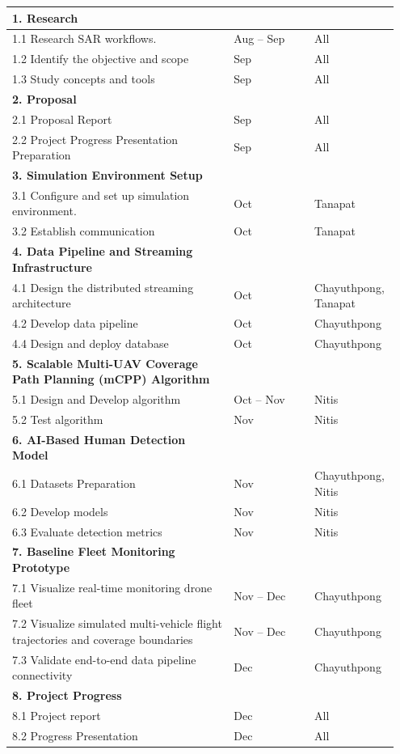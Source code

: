 \documentclass[12pt]{article}
\newcommand{\tablefont}{\fontsize{14pt}{16.8pt}\selectfont}
\begin{document}
{\tablefont
\begin{longtable}{|p{0.55\linewidth}|p{0.2\linewidth}|p{0.2\linewidth}|}
\hline
\rowcolor{orange!40}\textbf{1. Research} & & \\
\hline
1.1 Research SAR workflows. & Aug -- Sep & All \\
\hline
1.2 Identify the objective and scope & Sep & All \\
\hline
1.3 Study concepts and tools & Sep & All \\
\hline
\rowcolor{orange!40}\textbf{2. Proposal} & & \\
\hline
2.1 Proposal Report & Sep & All \\
\hline
2.2 Project Progress Presentation Preparation & Sep & All \\
\hline
\rowcolor{orange!40}\textbf{3. Simulation Environment Setup} & & \\
\hline
3.1 Configure and set up simulation environment. & Oct & Tanapat \\
\hline
3.2 Establish communication & Oct & Tanapat \\
\hline
\rowcolor{orange!40}\textbf{4. Data Pipeline and Streaming Infrastructure} & & \\
\hline
4.1 Design the distributed streaming architecture & Oct & Chayuthpong, Tanapat \\
\hline
4.2 Develop data pipeline & Oct & Chayuthpong \\
\hline
4.4 Design and deploy database & Oct & Chayuthpong \\
\hline
\rowcolor{orange!40}\textbf{5. Scalable Multi-UAV Coverage Path Planning (mCPP) Algorithm} & & \\
\hline
5.1 Design and Develop algorithm & Oct -- Nov & Nitis \\
\hline
5.2 Test algorithm & Nov & Nitis \\
\hline
\rowcolor{orange!40}\textbf{6. AI-Based Human Detection Model} & & \\
\hline
6.1 Datasets Preparation & Nov & Chayuthpong, Nitis \\
\hline
6.2 Develop models & Nov & Nitis \\
\hline
6.3 Evaluate detection metrics & Nov & Nitis \\
\hline
\rowcolor{orange!40}\textbf{7. Baseline Fleet Monitoring Prototype} & & \\
\hline
7.1 Visualize real-time monitoring drone fleet & Nov -- Dec & Chayuthpong \\
\hline
7.2 Visualize simulated multi-vehicle flight trajectories and
coverage boundaries & Nov -- Dec & Chayuthpong \\
\hline
7.3 Validate end-to-end data pipeline connectivity & Dec & Chayuthpong \\
\hline
\rowcolor{orange!40}\textbf{8. Project Progress} & & \\
\hline
8.1 Project report & Dec & All \\
\hline
8.2 Progress Presentation & Dec & All \\
\hline
\end{longtable}
}
\end{document}
